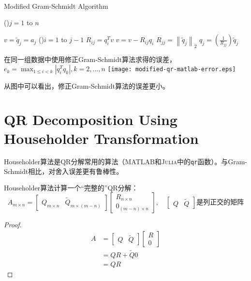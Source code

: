\begin{example}
    \begin{algorithm}[htbp]
        \caption{Modified Gram-Schmidt Algorithm}
        \For(){$j=1$ to $n$}{
            $v={\tilde{q} }_j =a_j$\;
            \For(){$i=1$ to $j-1$}{
                $R_{ij} = q_i^T v$\;
                $v = v - R_{ij} q_i$\;
            }
            $R_{ jj} ={\left\|{\tilde{q} }_j \right\|}_2$\;
            $q_j =\left(\frac{1}{R_{jj} }\right){\tilde{q} }_j$\;

        }
    \end{algorithm}


    \begin{FigureCenter}{在同一组数据中使用修正Gram-Schmidt算法求得的误差，$e_{k}=\max _{1 \leq i<k}\left|q_{i}^{T} q_{k}\right|,  k=2, \ldots, n$}
        \texttt{[image: modified-qr-matlab-error.eps]}
    \end{FigureCenter}

    从图中可以看出，修正Gram-Schmidt算法的误差更小。
\end{example}

\section{QR Decomposition Using Householder Transformation}

Householder算法是QR分解常用的算法（\textsc{MATLAB}和\textsc{Julia}中的\verb|qr|函数）。与Gram-Schmidt相比，对舍入误差更有鲁棒性。

Householder算法计算一个“完整的”QR分解：
\begin{equation} A_{m \times n}=\left[\begin{array}{ll}Q_{m \times n} & \tilde{Q}_{m \times (m-n)}\end{array}\right]\left[\begin{array}{l}R_{n  \times  n} \\ 0_{(m-n) \times n}\end{array}\right], \quad\left[\begin{array}{ll}Q & \tilde{Q}\end{array}\right]  是列正交的矩阵\end{equation}

\begin{proof}
    \begin{equation}
    \begin{aligned}
        A&=\left[\begin{array}{ll}Q & \tilde{Q}\end{array}\right]\left[\begin{array}{l}R \\ 0\end{array}\right]\\
        &=QR + \tilde{Q} 0 \\ 
        & = QR
    \end{aligned}
    \end{equation}
\end{proof}

